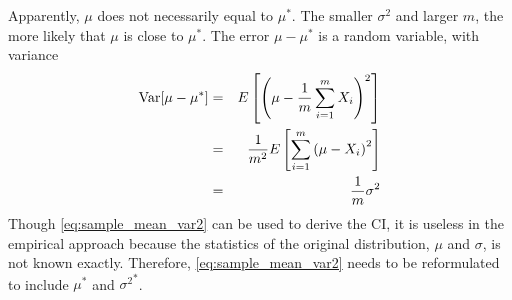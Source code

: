 Apparently, $\mu$ does not necessarily equal to $\mu^*$. The smaller $\sigma^2$ and larger $m$, the more likely that $\mu$ is close to $\mu^*$. The error $\mu - \mu^*$ is a random variable, with variance
\begin{eqnarray}
	\textup{Var}[\mu-\mu^*] &=& E\left[\left(\mu-\dfrac{1}{m}\sum_{i=1}^{m} X_i\right)^2\right] \nonumber \\
	&=& \dfrac{1}{m^2}E\left[\sum_{i=1}^{m}\left(\mu-X_i\right)^2\right] \label{eq:sample_mean_var1} \\
	&=& \dfrac{1}{m}\sigma^2 \label{eq:sample_mean_var2}
\end{eqnarray}
Though \eqref{eq:sample_mean_var2} can be used to derive the CI, it is useless in the empirical approach because the statistics of the original distribution, $\mu$ and $\sigma$, is not known exactly. Therefore, \eqref{eq:sample_mean_var2} needs to be reformulated to include $\mu^*$ and ${\sigma^2}^*$.

